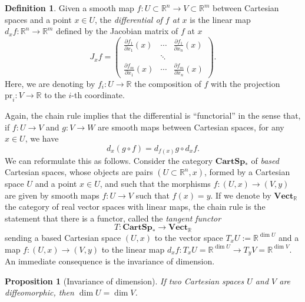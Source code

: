 \documentclass[11pt,a4paper]{book}
\newtheorem{prop}[thm]{Proposition}
\theoremstyle{remark} \newtheorem{rmk}[thm]{Remark}
\theoremstyle{definition} \newtheorem{defn}[thm]{Definition}
\theoremstyle{definition} \newtheorem{ex}[thm]{Example}
\theoremstyle{definition} \newtheorem{ej}[thm]{Exercise}
\begin{document}
\begin{defn}
Given a smooth map $f:U\subset \mathbb{R}^n\rightarrow V\subset \mathbb{R}^m$ between Cartesian spaces and a point $x\in U$, the \emph{differential of $f$ at $x$} is the linear map $d_xf:\mathbb{R}^n \rightarrow \mathbb{R}^m$ defined by the Jacobian matrix of $f$ at $x$
\begin{equation*}
  J_x f =
  \begin{pmatrix}
\frac{\partial f_1}{\partial x_1} (x) & \cdots & \frac{\partial f_1}{\partial x_n} (x) \\
& \ddots & \\
\frac{\partial f_m}{\partial x_1} (x) & \cdots & \frac{\partial f_m}{\partial x_n} (x)
  \end{pmatrix}.
\end{equation*}
Here, we are denoting by $f_i:U\rightarrow \mathbb{R}$ the composition of $f$ with the projection $\mathrm{pr}_i:V\rightarrow \mathbb{R}$ to the $i$-th coordinate.
\end{defn}

Again, the chain rule implies that the differential is ``functorial'' in the sense that, if $f:U\rightarrow V$ and $g:V\rightarrow W$ are smooth maps between Cartesian spaces, for any $x\in U$, we have
\begin{equation*}
d_x(g\circ f) = d_{f(x)} g \circ d_x f.
\end{equation*}
We can reformulate this as follows. Consider the category $\mathbf{CartSp}_*$ of \emph{based} Cartesian spaces, whose objects are pairs $(U\subset \mathbb{R}^n,x)$, formed by a Cartesian space $U$ and a point $x\in U$, and such that the morphisms $f:(U,x)\rightarrow (V,y)$ are given by smooth maps $f:U\rightarrow V$ such that $f(x)=y$. If we denote by $\mathbf{Vect}_{\mathbb{R}}$ the category of real vector spaces with linear maps, the chain rule is the statement that there is a functor, called the \emph{tangent functor}
\begin{equation*}
T: \mathbf{CartSp}_* \longrightarrow \mathbf{Vect}_{\mathbb{R}}
\end{equation*}
sending a based Cartesian space $(U,x)$ to the vector space $T_xU:= \mathbb{R}^{\dim U}$ and a map $f:(U,x)\rightarrow (V,y)$ to the linear map $d_xf:T_xU=\mathbb{R}^{\dim U} \rightarrow T_yV=\mathbb{R}^{\dim V}$. An immediate consequence is the invariance of dimension.

\begin{prop}[Invariance of dimension]
If two Cartesian spaces $U$ and $V$ are diffeomorphic, then $\dim U = \dim V$.
\end{prop}
\end{document}
